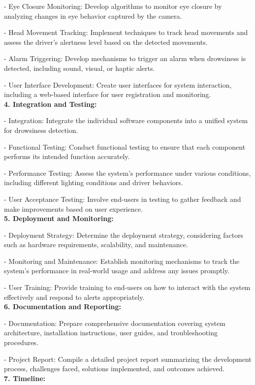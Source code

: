 \documentclass[12pt]{article}
\begin{document}
   - Eye Closure Monitoring: Develop algorithms to monitor eye closure by analyzing changes in eye behavior captured by the camera.

   - Head Movement Tracking: Implement techniques to track head movements and assess the driver's alertness level based on the detected movements.

   - Alarm Triggering: Develop mechanisms to trigger an alarm when drowsiness is detected, including sound, visual, or haptic alerts.

   - User Interface Development: Create user interfaces for system interaction, including a web-based interface for user registration and monitoring.\\
\textbf{4. Integration and Testing:}

   - Integration: Integrate the individual software components into a unified system for drowsiness detection.

   - Functional Testing: Conduct functional testing to ensure that each component performs its intended function accurately.

   - Performance Testing: Assess the system's performance under various conditions, including different lighting conditions and driver behaviors.

   - User Acceptance Testing: Involve end-users in testing to gather feedback and make improvements based on user experience.\\
\textbf{5. Deployment and Monitoring:}

   - Deployment Strategy: Determine the deployment strategy, considering factors such as hardware requirements, scalability, and maintenance.

   - Monitoring and Maintenance: Establish monitoring mechanisms to track the system's performance in real-world usage and address any issues promptly.

   - User Training: Provide training to end-users on how to interact with the system effectively and respond to alerts appropriately.\\
\textbf{6. Documentation and Reporting:}

   - Documentation: Prepare comprehensive documentation covering system architecture, installation instructions, user guides, and troubleshooting procedures.

   - Project Report: Compile a detailed project report summarizing the development process, challenges faced, solutions implemented, and outcomes achieved.\\
\textbf{7. Timeline:}
\end{document}
